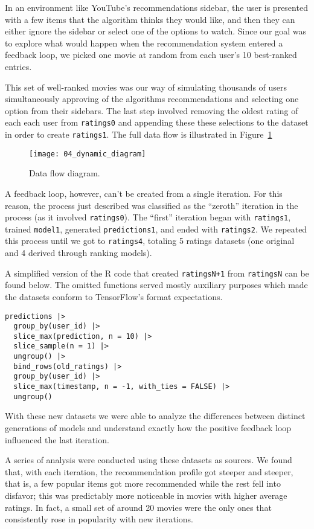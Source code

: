 In an environment like YouTube's recommendations sidebar, the user is presented
with a few items that the algorithm thinks they would like, and then they can
either ignore the sidebar or select one of the options to watch. Since our goal
was to explore what would happen when the recommendation system entered a
feedback loop, we picked one movie at random from each user's 10 best-ranked
entries.

This set of well-ranked movies was our way of simulating thousands of users
simultaneously approving of the algorithms recommendations and selecting one
option from their sidebars. The last step involved removing the oldest rating of
each each user from \verb|ratings0| and appending these these selections to the
dataset in order to create \verb|ratings1|. The full data flow is illustrated
in Figure~\ref{fig:fig04_01}

\begin{figure}
  \centering
  \texttt{[image: 04\_dynamic\_diagram]}
  \caption{Data flow diagram.\label{fig:fig04_01}}
\end{figure}

A feedback loop, however, can't be created from a single iteration. For this
reason, the process just described was classified as the ``zeroth'' iteration in
the process (as it involved \verb|ratings0|). The ``first'' iteration began with
\verb|ratings1|, trained \verb|model1|, generated \verb|predictions1|, and ended
with \verb|ratings2|. We repeated this process until we got to \verb|ratings4|,
totaling 5 ratings datasets (one original and 4 derived through ranking models).

A simplified version of the R code that created \verb|ratingsN+1| from
\verb|ratingsN| can be found below. The omitted functions served mostly
auxiliary purposes which made the datasets conform to TensorFlow's format
expectations.

\begin{verbatim}
predictions |>
  group_by(user_id) |>
  slice_max(prediction, n = 10) |>
  slice_sample(n = 1) |>
  ungroup() |>
  bind_rows(old_ratings) |>
  group_by(user_id) |>
  slice_max(timestamp, n = -1, with_ties = FALSE) |>
  ungroup()
\end{verbatim}

With these new datasets we were able to analyze the differences between distinct
generations of models and understand exactly how the positive feedback loop
influenced the last iteration.

A series of analysis were conducted using these datasets as sources. We found
that, with each iteration, the recommendation profile got steeper and steeper,
that is, a few popular items got more recommended while the rest fell into
disfavor; this was predictably more noticeable in movies with higher average
ratings. In fact, a small set of around 20 movies were the only ones that
consistently rose in popularity with new iterations.

